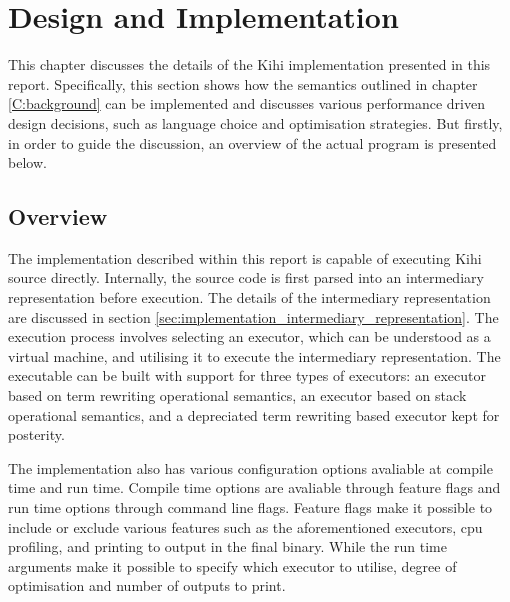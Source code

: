 \chapter{Design and Implementation} \label{C:implementation} 
This chapter discusses the details of the Kihi implementation presented in this report. Specifically, this section shows how the semantics outlined in chapter \ref{C:background} can be implemented and discusses various performance driven design decisions, such as language choice and optimisation strategies. But firstly, in order to guide the discussion, an overview of the actual program is presented below.

\section{Overview}
The implementation described within this report is capable of executing Kihi source directly. Internally, the source code is first parsed into an intermediary representation before execution. The details of the intermediary representation are discussed in section \ref{sec:implementation_intermediary_representation}. The execution process involves selecting an executor, which can be understood as a virtual machine, and utilising it to execute the intermediary representation. The executable can be built with support for three types of executors: an executor based on term rewriting operational semantics, an executor based on stack operational semantics, and a depreciated term rewriting based executor kept for posterity. 

The implementation also has various configuration options avaliable at compile time and run time. Compile time options are avaliable through feature flags and run time options through command line flags. Feature flags make it possible to include or exclude various features such as the aforementioned executors, cpu profiling, and printing to output in the final binary. While the run time arguments make it possible to specify which executor to utilise, degree of optimisation and number of outputs to print.



